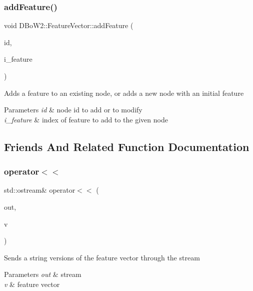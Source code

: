 \subsubsection{\texorpdfstring{add\+Feature()}{addFeature()}}
{\footnotesize\ttfamily void D\+Bo\+W2\+::\+Feature\+Vector\+::add\+Feature (\begin{DoxyParamCaption}\item[{\mbox{\hyperlink{namespace_d_bo_w2_a3a0fa9c50c0df508759362d6204566f2}{Node\+Id}}}]{id,  }\item[{unsigned int}]{i\+\_\+feature }\end{DoxyParamCaption})}

Adds a feature to an existing node, or adds a new node with an initial feature 
\begin{DoxyParams}{Parameters}
{\em id} & node id to add or to modify \\
\hline
{\em i\+\_\+feature} & index of feature to add to the given node \\
\hline
\end{DoxyParams}


\subsection{Friends And Related Function Documentation}
\mbox{\label{class_d_bo_w2_1_1_feature_vector_a34aa65c93dc5f6be269610e3f238d9b1}} 
\subsubsection{\texorpdfstring{operator$<$$<$}{operator<<}}
{\footnotesize\ttfamily std\+::ostream\& operator$<$$<$ (\begin{DoxyParamCaption}\item[{std\+::ostream \&}]{out,  }\item[{const \mbox{\hyperlink{class_d_bo_w2_1_1_feature_vector}{Feature\+Vector}} \&}]{v }\end{DoxyParamCaption})\hspace{0.3cm}{\ttfamily [friend]}}

Sends a string versions of the feature vector through the stream 
\begin{DoxyParams}{Parameters}
{\em out} & stream \\
\hline
{\em v} & feature vector \\
\hline
\end{DoxyParams}


